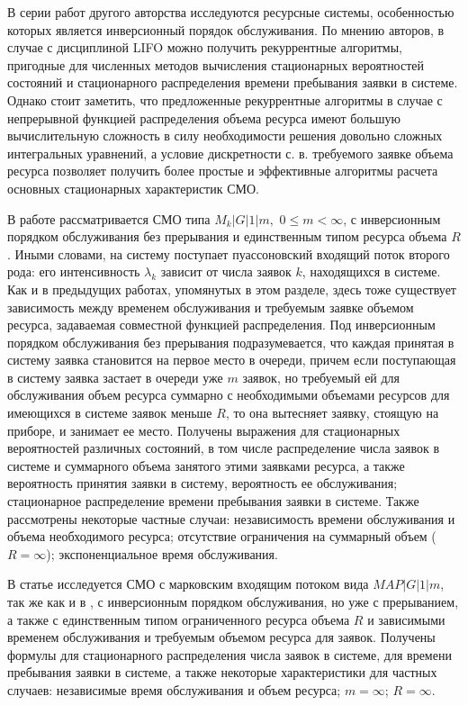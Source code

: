 \documentclass[a4paper,12pt]{article}
\begin{document}
В серии работ другого авторства \cite{Pechinkin_28_2011,Pechinkin_29_2012,Pechinkin_30_1998,Pechinkin_31_1999} исследуются ресурсные системы, особенностью которых является инверсионный порядок обслуживания.
По мнению авторов, в случае с дисциплиной LIFO можно получить рекуррентные алгоритмы, пригодные для численных методов вычисления стационарных вероятностей состояний и стационарного распределения времени пребывания заявки в системе. Однако стоит заметить, что предложенные рекуррентные алгоритмы в случае с непрерывной функцией распределения объема ресурса \cite{Pechinkin_30_1998,Pechinkin_31_1999} имеют большую вычислительную сложность в силу необходимости решения довольно сложных интегральных уравнений, а условие дискретности с. в. требуемого заявке объема ресурса \cite{Pechinkin_28_2011,Pechinkin_29_2012} позволяет получить более простые и эффективные алгоритмы расчета основных стационарных характеристик СМО.

В работе \cite{Pechinkin_30_1998} рассматривается СМО типа $M_k|G|1|m,$ $0\leq m <\infty$, с инверсионным порядком обслуживания без прерывания и единственным типом ресурса объема $R$. Иными словами, на систему поступает пуассоновский входящий поток второго рода: его интенсивность $\lambda_k$ зависит от числа заявок $k$, находящихся в системе. Как и в предыдущих работах, упомянутых в этом разделе, здесь тоже существует зависимость между временем обслуживания и требуемым заявке объемом ресурса, задаваемая совместной функцией распределения. Под инверсионным порядком обслуживания без прерывания подразумевается, что каждая принятая в систему заявка становится на первое место в очереди, причем если поступающая в систему заявка застает в очереди уже $m$ заявок, но требуемый ей для обслуживания объем ресурса суммарно с необходимыми объемами ресурсов для имеющихся в системе заявок меньше $R$, то она вытесняет заявку, стоящую на приборе, и занимает ее место. Получены выражения для стационарных вероятностей различных состояний, в том числе распределение числа заявок в системе и суммарного объема занятого этими заявками ресурса, а также вероятность принятия заявки в систему, вероятность ее обслуживания; стационарное распределение времени пребывания заявки в системе. Также рассмотрены некоторые частные случаи: независимость времени обслуживания и объема необходимого ресурса; отсутствие ограничения на суммарный объем ($R=\infty$); экспоненциальное время обслуживания.

В статье \cite{Pechinkin_31_1999} исследуется СМО с марковским входящим потоком вида $MAP|G|1|m$, так же как и в \cite{Pechinkin_30_1998}, с инверсионным порядком обслуживания, но уже с прерыванием, а также с единственным типом ограниченного ресурса объема $R$ и зависимыми временем обслуживания и требуемым объемом ресурса для заявок. Получены формулы для стационарного распределения числа заявок в системе, для времени пребывания заявки в системе, а также некоторые характеристики для частных случаев: независимые время обслуживания и объем ресурса; $m=\infty$; $R=\infty$.
\end{document}
